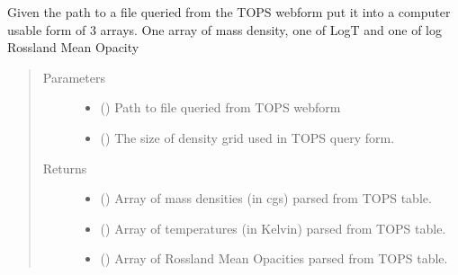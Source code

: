 \documentclass[letterpaper,10pt,english]{sphinxmanual}
\begin{document}

\begin{fulllineitems}
\label{\detokenize{pyTOPSScrape.api:pyTOPSScrape.api.convert.parse_RMO_TOPS_table_file}}
\sphinxAtStartPar
Given the path to a file queried from the TOPS webform put it into a
computer usable form of 3 arrays. One array of mass density, one of
LogT and one of log Rossland Mean Opacity
\begin{quote}\begin{description}
\item[{Parameters}] \leavevmode\begin{itemize}
\item {} 
\sphinxAtStartPar
{} () \textendash{} Path to file queried from TOPS webform

\item {} 
\sphinxAtStartPar
{} (\sphinxstyleliteralemphasis{\sphinxupquote{, }}) \textendash{} The size of density grid used in TOPS query form.

\end{itemize}

\item[{Returns}] \leavevmode
\sphinxAtStartPar
\begin{itemize}
\item {} 
\sphinxAtStartPar
{} () \textendash{} Array of mass densities (in cgs) parsed from TOPS table.

\item {} 
\sphinxAtStartPar
{} () \textendash{} Array of temperatures (in Kelvin) parsed from TOPS table.

\item {} 
\sphinxAtStartPar
{} () \textendash{} Array of Rossland Mean Opacities parsed from TOPS table.

\end{itemize}


\end{description}\end{quote}

\end{fulllineitems}
\end{document}
